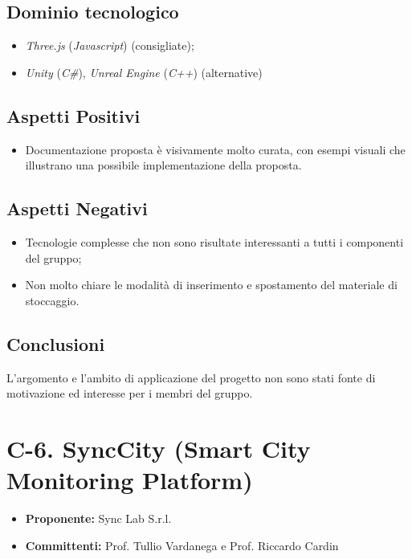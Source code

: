 \documentclass{article}
\begin{document}
\subsection{Dominio tecnologico}
\begin{itemize}
    \item \textit{Three.js} (\textit{Javascript}) (consigliate);
    \item \textit{Unity} (\textit{C\#}), \textit{Unreal Engine} (\textit{C++}) (alternative)
\end{itemize}

\subsection{Aspetti Positivi}
\begin{itemize}
    \item Documentazione proposta è visivamente molto curata, con esempi visuali che illustrano una possibile implementazione della proposta.
\end{itemize}

\subsection{Aspetti Negativi}
\begin{itemize}
    \item Tecnologie complesse che non sono risultate interessanti a tutti i componenti del gruppo;
    \item Non molto chiare le modalità di inserimento e spostamento del materiale di stoccaggio.
\end{itemize}
\subsection{Conclusioni}
L’argomento e l’ambito di applicazione del progetto non sono stati fonte di motivazione ed interesse per i membri del gruppo.



\newpage



\section{C-6. SyncCity (Smart City Monitoring Platform)}
\begin{itemize}
    \item \textbf{Proponente:} Sync Lab S.r.l.
    \item \textbf{Committenti:}  Prof. Tullio Vardanega e Prof. Riccardo Cardin
\end{itemize}
\end{document}
